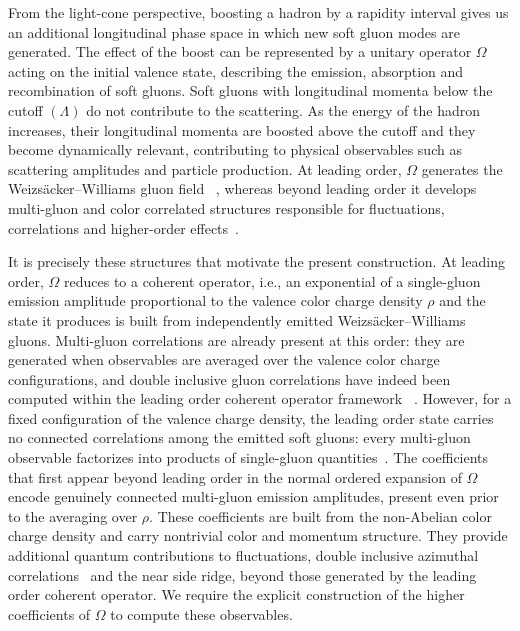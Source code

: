 \documentclass[a4paper,11pt]{article}
\begin{document}
From the light-cone perspective, boosting a hadron by a rapidity interval gives us an additional longitudinal phase space in which new soft gluon modes are generated. The effect of the boost can be represented by a unitary operator $\Omega$ acting on the initial valence state, describing the emission, absorption and recombination of soft gluons. Soft gluons with longitudinal momenta below the cutoff $(\Lambda)$ do not contribute to the scattering. As the energy of the hadron increases, their longitudinal momenta are boosted above the cutoff and they become dynamically relevant, contributing to physical observables such as scattering amplitudes and particle production. At leading order, $\Omega$ generates the Weizsäcker–Williams gluon field ~\cite{Kovner:2005nq,Kovner:2016jfp}, whereas beyond leading order it develops multi-gluon and color correlated structures responsible for fluctuations, correlations and higher-order effects~\cite{Kar:2021hzt}.

It is precisely these structures that motivate the present construction. At leading order, $\Omega$ reduces to a coherent operator, i.e., an exponential of a single-gluon emission amplitude proportional to the valence color charge density $\rho$ and the state it produces is built from independently emitted Weizs\"acker--Williams gluons. Multi-gluon correlations are already present at this order: they are generated when observables are averaged over the valence color charge configurations, and double inclusive gluon correlations have indeed been computed within the leading order coherent operator framework ~\cite{Kovner:2011zz,Altinoluk:2018ogz,Kovner:2016jfp}. However, for a fixed configuration of the valence charge density, the leading order state carries no connected correlations among the emitted soft gluons: every multi-gluon observable factorizes into products of single-gluon quantities~\cite{Balitsky:1998ya}. The coefficients that first appear beyond leading order in the normal ordered expansion of $\Omega$ encode genuinely connected multi-gluon emission amplitudes, present even prior to the averaging over $\rho$. These coefficients are built from the non-Abelian color charge density and carry nontrivial color and momentum structure. They provide additional quantum contributions to fluctuations, double inclusive azimuthal correlations~\cite{McLerran:2016snu} and the near side ridge, beyond those generated by the leading order coherent operator. We require the explicit construction of the higher coefficients of $\Omega$ to compute these observables.
\end{document}
